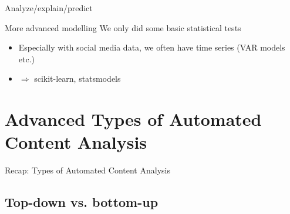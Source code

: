\documentclass{beamer}
\begin{document}
\begin{frame}{Analyze/explain/predict}
	\begin{block}{More advanced modelling}
We only did some basic statistical tests
		\begin{itemize}
			\item Especially with social media data, we often have time series (VAR models etc.)
		\item $\Rightarrow$ scikit-learn, statsmodels
		\end{itemize}
	\end{block}
\end{frame}


\section[Advanced ACA]{Advanced Types of Automated Content Analysis}
\begin{frame}{}
Recap: Types of Automated Content Analysis
\end{frame}

\subsection*{Top-down vs. bottom-up}

\begin{frame}[plain]
\end{frame}
\end{document}
